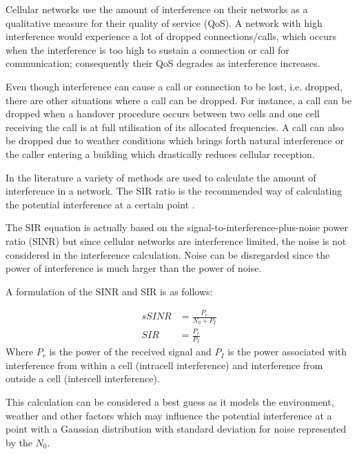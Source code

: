Cellular networks use the amount of interference on their networks as a qualitative measure for their quality of service (QoS)\cite{WirelessCommunications}. A network with high interference would experience a lot of dropped connections/calls, which occurs when the interference is too high to sustain a connection or call for communication; consequently their QoS degrades as interference increases\cite{WirelessCommunications,WirelessDigitalCommunications}.

Even though interference can cause a call or connection to be lost, i.e. dropped, there are other situations where a call can be dropped\cite{GSMSysEngin}. For instance, a call can be dropped when a handover procedure occurs between two cells and one cell receiving the call is at full utilisation of its allocated frequencies\cite{GSMSysEngin,WirelessDigitalCommunications}. A call can also be dropped due to weather conditions which brings forth natural interference or the caller entering a building which drastically reduces cellular reception\cite{WirelessDigitalCommunications}.

In the literature a variety of methods are used to calculate the amount of interference in a network. The SIR ratio is the recommended way of calculating the potential interference at a certain point \cite{Karen2004}. 

The SIR equation is actually based on the signal-to-interference-plus-noise power ratio (SINR) but since cellular networks are interference limited, the noise is not considered in the interference calculation\cite{WirelessCommunications}. Noise can be disregarded since the power of interference is much larger than the power of noise\cite{WirelessDigitalCommunications}.

A formulation of the SINR and SIR is as follows:

\begin{align}s 
	SINR &= \frac{P_r}{N_0 + P_I}\\
	SIR &= \frac{P_r}{P_I}
\end{align}
Where $P_r$ is the power of the received signal and $P_I$ is the power associated with interference from within a cell (intracell interference) and interference from outside a cell (intercell interference)\cite{WirelessCommunications}.

This calculation can be considered a best guess as it models the environment, weather and other factors which may influence the potential interference at a point with a Gaussian distribution with standard deviation for noise represented by the $N_0$\cite{Karen2004}. 

